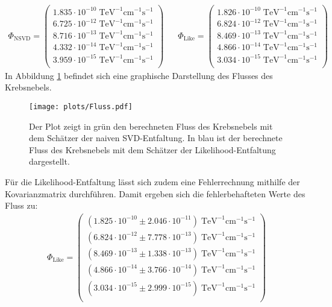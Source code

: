 \begin{align*}
	\Phi_{\text{NSVD}} = \begin{pmatrix}
			1.835\cdot10^{-10}\;\mathrm{TeV}^{-1}\mathrm{cm}^{-1}\mathrm{s}^{-1}\\
			6.725\cdot10^{-12}\;\mathrm{TeV}^{-1}\mathrm{cm}^{-1}\mathrm{s}^{-1}\\
			8.716\cdot10^{-13}\;\mathrm{TeV}^{-1}\mathrm{cm}^{-1}\mathrm{s}^{-1}\\
			4.332\cdot10^{-14}\;\mathrm{TeV}^{-1}\mathrm{cm}^{-1}\mathrm{s}^{-1}\\
			3.959\cdot10^{-15}\;\mathrm{TeV}^{-1}\mathrm{cm}^{-1}\mathrm{s}^{-1}\\
	 \end{pmatrix} &\;\;\; \Phi_{\text{Like}}  = \begin{pmatrix}
				1.826\cdot10^{-10}\;\mathrm{TeV}^{-1}\mathrm{cm}^{-1}\mathrm{s}^{-1}\\
				6.824\cdot10^{-12}\;\mathrm{TeV}^{-1}\mathrm{cm}^{-1}\mathrm{s}^{-1}\\
				8.469\cdot10^{-13}\;\mathrm{TeV}^{-1}\mathrm{cm}^{-1}\mathrm{s}^{-1}\\
				4.866\cdot10^{-14}\;\mathrm{TeV}^{-1}\mathrm{cm}^{-1}\mathrm{s}^{-1}\\
				3.034\cdot10^{-15}\;\mathrm{TeV}^{-1}\mathrm{cm}^{-1}\mathrm{s}^{-1}\\
		\end{pmatrix}
\end{align*}
In Abbildung \ref{fig:Fluss} befindet sich eine graphische Darstellung des Flusses des Krebsnebels.\\
\begin{figure}
  \centering
  \texttt{[image: plots/Fluss.pdf]}
  \caption{Der Plot zeigt in grün den berechneten Fluss des Krebsnebels mit dem Schätzer der naiven SVD-Entfaltung. In blau ist der berechnete Fluss des Krebsnebels mit dem Schätzer der Likelihood-Entfaltung dargestellt.}
  \label{fig:Fluss}
\end{figure}
Für die Likelihood-Entfaltung lässt sich zudem eine Fehlerrechnung mithilfe der Kovarianzmatrix durchführen. Damit ergeben sich die fehlerbehafteten Werte des Fluss zu:
\begin{align*}
	\Phi_{\text{Like}} = \begin{pmatrix}
			(1.825\cdot10^{-10}\pm 2.046\cdot10^{-11})\;\mathrm{TeV}^{-1}\mathrm{cm}^{-1}\mathrm{s}^{-1}\\
			(6.824\cdot10^{-12}\pm 7.778\cdot10^{-13})\;\mathrm{TeV}^{-1}\mathrm{cm}^{-1}\mathrm{s}^{-1}\\
			(8.469\cdot10^{-13}\pm 1.338\cdot10^{-13})\;\mathrm{TeV}^{-1}\mathrm{cm}^{-1}\mathrm{s}^{-1}\\
			(4.866\cdot10^{-14}\pm 3.766\cdot10^{-14})\;\mathrm{TeV}^{-1}\mathrm{cm}^{-1}\mathrm{s}^{-1}\\
			(3.034\cdot10^{-15}\pm 2.999\cdot10^{-15})\;\mathrm{TeV}^{-1}\mathrm{cm}^{-1}\mathrm{s}^{-1}\\
	 \end{pmatrix}
\end{align*}
